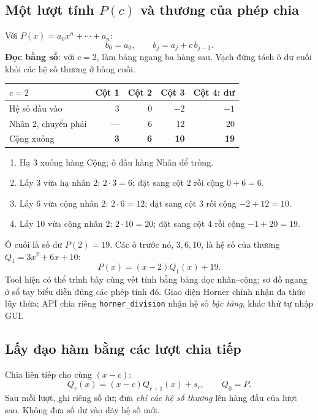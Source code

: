 \subsection{Một lượt tính $P(c)$ và thương của phép chia}
Với $P(x)=a_0x^n+\cdots+a_n$:
\[
 b_0=a_0,\qquad b_j=a_j+c\,b_{j-1}.
\]
\textbf{Đọc bằng số}: với $c=2$, làm bảng ngang ba hàng sau. Vạch đứng tách ô dư cuối khỏi các hệ số thương ở hàng cuối.
\begin{center}\small
\begin{tabular}{@{}lrrr|r@{}}\toprule
$c=2$ & Cột 1 & Cột 2 & Cột 3 & Cột 4: dư\\\midrule
Hệ số đầu vào & 3 & 0 & $-2$ & $-1$\\
Nhân $2$, chuyển phải & --- & 6 & 12 & 20\\\midrule
Cộng xuống & \textbf{3} & \textbf{6} & \textbf{10} & \textbf{19}\\\bottomrule
\end{tabular}\end{center}
\begin{enumerate}
\item Hạ 3 xuống hàng Cộng; ô đầu hàng Nhân để trống.
\item Lấy 3 vừa hạ nhân 2: $2\cdot3=6$; đặt sang cột 2 rồi cộng $0+6=6$.
\item Lấy 6 vừa cộng nhân 2: $2\cdot6=12$; đặt sang cột 3 rồi cộng $-2+12=10$.
\item Lấy 10 vừa cộng nhân 2: $2\cdot10=20$; đặt sang cột 4 rồi cộng $-1+20=19$.
\end{enumerate}
Ô cuối là số dư $P(2)=19$. Các ô trước nó, $3,6,10$, là hệ số của thương $Q_1=3x^2+6x+10$:
\[
 P(x)=(x-2)Q_1(x)+19.
\]
Tool hiện có thể trình bày cùng vết tính bằng bảng dọc nhân--cộng; sơ đồ ngang ở sổ tay biểu diễn đúng các phép tính đó. Giao diện Horner chính nhận đa thức lũy thừa; API chia riêng \texttt{horner\_division} nhận hệ số \emph{bậc tăng}, khác thứ tự nhập GUI.

\subsection{Lấy đạo hàm bằng các lượt chia tiếp}
Chia liên tiếp cho cùng $(x-c)$:
\[
 Q_r(x)=(x-c)Q_{r+1}(x)+s_r,\qquad Q_0=P.
\]
Sau mỗi lượt, ghi riêng số dư; đưa \emph{chỉ các hệ số thương} lên hàng đầu của lượt sau. Không đưa số dư vào dãy hệ số mới.

